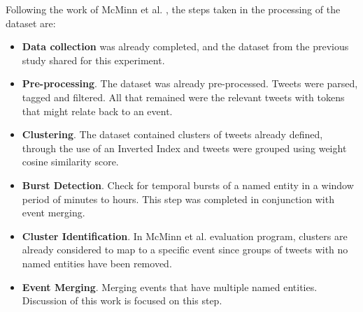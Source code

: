 \documentclass[a4paper,portrait,12pt]{article}
\begin{document}
Following the work of McMinn et al. \cite{McMinn2013}, the steps taken in the processing of the dataset are:
\begin{itemize}
	\item \textbf{Data collection} was already completed, and the dataset from the previous study shared for this experiment.
	\item \textbf{Pre-processing}. The dataset was already pre-processed. Tweets were parsed, tagged and filtered. All that remained were the relevant tweets with tokens that might relate back to an event.
	\item \textbf{Clustering}. The dataset contained clusters of tweets already defined, through the use of an Inverted Index and tweets were grouped using weight cosine similarity score.
	\item \textbf{Burst Detection}. Check for temporal bursts of a named entity in a window period of minutes to hours. This step was completed in conjunction with event merging.
	\item \textbf{Cluster Identification}. In McMinn et al. \cite{McMinn2013} evaluation program, clusters are already considered to map to a specific event since groups of tweets with no named entities have been removed.
	\item \textbf{Event Merging}. Merging events that have multiple named entities. Discussion of this work is focused on this step.
\end{itemize}
\end{document}
